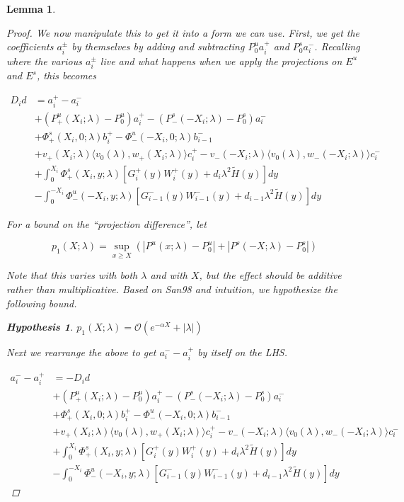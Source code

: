 \documentclass[12pt]{article}
\newtheorem{lemma}{Lemma}
\newtheorem{hypothesis}{Hypothesis}
\begin{document}
\begin{lemma}
\begin{proof}
We now manipulate this to get it into a form we can use. First, we get the coefficients $a_i^\pm$ by themselves by adding and subtracting $P_0^u a_i^+$ and $P_0^s a_i^-$. Recalling where the various $a_i^\pm$ live and what happens when we apply the projections on $E^u$ and $E^s$, this becomes

\begin{align*}
D_i d &= a_i^+ - a_i^- \\
&+ (P^u_+(X_i; \lambda) - P_0^u)a_i^+ - (P^s_-(-X_i; \lambda) - P_0^s)a_i^- \\
&+ \Phi^s_+(X_i, 0; \lambda)b_i^+ - \Phi^u_-(-X_i, 0; \lambda)b_{i-1}^- \\
&+ v_+(X_i; \lambda) \langle v_0(\lambda), w_+(X_i; \lambda) \rangle c_i^+ - v_-(-X_i; \lambda) \langle v_0(\lambda), w_-(-X_i; \lambda) \rangle c_i^- \\
&+ \int_0^{X_i} \Phi^s_+(X_i, y; \lambda) [ G_i^+(y) W_i^+(y) + d_i \lambda^2 \tilde{H}(y) ] dy \\
&- \int_0^{-X_i} \Phi^u_-(-X_i, y; \lambda) [ G_{i-1}^-(y) W_{i-1}^-(y) + d_{i-1} \lambda^2 \tilde{H}(y) ] dy
\end{align*}

For a bound on the ``projection difference'', let

\[
p_1(X;\lambda) = \sup_{x \geq X} (|P^u(x; \lambda) - P_0^u| + |P^s(-X; \lambda) - P_0^s|)
\]

Note that this varies with both $\lambda$ and with $X$, but the effect should be additive rather than multiplicative. Based on San98 and intuition, we hypothesize the following bound.

\begin{hypothesis}
$ p_1(X;\lambda) = \mathcal{O}( e^{-\alpha X} + |\lambda| )$
\end{hypothesis}

Next we rearrange the above to get $a_i^- - a_i^+$ by itself on the LHS.

\begin{align*}
a_i^- - a_i^+ &= -D_i d  \\
&+ (P^u_+(X_i; \lambda) - P_0^u)a_i^+ - (P^s_-(-X_i; \lambda) - P_0^s)a_i^- \\
&+ \Phi^s_+(X_i, 0; \lambda)b_i^+ - \Phi^u_-(-X_i, 0; \lambda)b_{i-1}^- \\
&+ v_+(X_i; \lambda) \langle v_0(\lambda), w_+(X_i; \lambda) \rangle c_i^+ - v_-(-X_i; \lambda) \langle v_0(\lambda), w_-(-X_i; \lambda) \rangle c_i^- \\
&+ \int_0^{X_i} \Phi^s_+(X_i, y; \lambda) [ G_i^+(y) W_i^+(y) + d_i \lambda^2 \tilde{H}(y) ] dy \\
&- \int_0^{-X_i} \Phi^u_-(-X_i, y; \lambda) [ G_{i-1}^-(y) W_{i-1}^-(y) + d_{i-1} \lambda^2 \tilde{H}(y) ] dy
\end{align*}


\end{proof}
\end{lemma}
\end{document}
